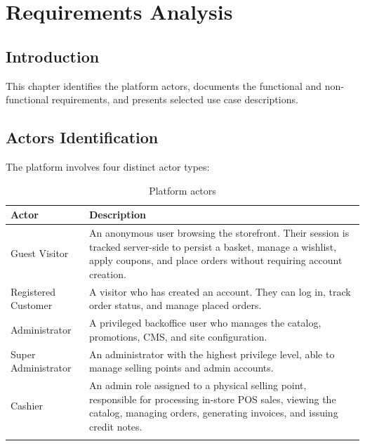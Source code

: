
\chapter{Requirements Analysis}

\section*{Introduction}
This chapter identifies the platform actors, documents the functional and
non-functional requirements, and presents selected use case descriptions.

\section{Actors Identification}

The platform involves four distinct actor types:

\begin{longtable}{|m{3.5cm}|m{10cm}|}
    \hline
    \textbf{Actor}      & \textbf{Description}                                                                                                                                                                        \\
    \hline
    \endhead
    \endfoot
    \endlastfoot
    \hline
    Guest Visitor       & An anonymous user browsing the storefront. Their session is tracked server-side to persist a basket, manage a wishlist, apply coupons, and place orders without requiring account creation. \\
    \hline
    Registered Customer & A visitor who has created an account. They can log in, track order status, and manage placed orders.                                                                                        \\
    \hline
    Administrator       & A privileged backoffice user who manages the catalog, promotions, CMS, and site configuration.                                                                                              \\
    \hline
    Super Administrator & An administrator with the highest privilege level, able to manage selling points and admin accounts.                                                                                        \\
    \hline
    Cashier             & An admin role assigned to a physical selling point, responsible for processing in-store POS sales, viewing the catalog, managing orders, generating invoices, and issuing credit notes.     \\
    \hline
    \caption{Platform actors}
    \label{tab:actors}
\end{longtable}

